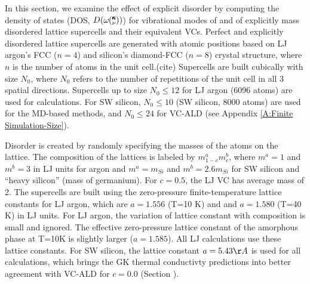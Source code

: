 \documentclass[aps,prb,onecolumn,preprint,superscriptaddress,amsmath,amssymb,floatfix]{revtex4}
\newcommand{\kv}{\mspace{-4.0mu}\left(\mspace{-8.0mu}
\begin{smallmatrix}&\pmb{\kappa} \\&\nu\end{smallmatrix}
\mspace{-3.0mu}\right)}
\begin{document}
In this section, we examine the effect of explicit disorder by computing 
the density of states (DOS, $D(\omega\kv)$) for vibrational modes of  
and of explicitly mass disordered lattice supercells and their 
equivalent VCs. 
Perfect and explicitly disordered lattice supercells are generated 
with atomic positions 
based on LJ argon's FCC ($n=4$) and silicon's diamond-FCC ($n=8$) 
crystal structure, where $n$ is the number of atoms 
in the unit cell.(cite)  
Supercells are built cubically with size $N_0$, where $N_0$ refers to the 
number of repetitions of the unit cell in all 3 
spatial directions. Supercells up to size $N_0 \le 12$ 
for LJ argon (6096 atoms) are used for calculations. For SW silicon, 
$N_0 \le 10$ (SW silicon, 8000 atoms) are used for 
the MD-based methods, and $N_0 \le 24$ for VC-ALD 
(see Appendix \ref{A:Finite Simulation-Size}).  

Disorder is created by randomly specifying the masses of the atoms 
on the lattice. 
The composition of the lattices is labeled by $m^a_{1-c}m^b_{c}$,  
where $m^a=1$ and $m^b=3$ in 
LJ units for argon and $m^a=m_{Si}$ and $m^b=2.6m_{Si}$ 
for SW silicon and ``heavy silicon'' (mass of germanium). 
For $c=0.5$, the LJ VC has average mass of 2. 
The supercells are built using 
the zero-pressure finite-temperature lattice constants 
for LJ argon, which are $a=1.556$ (T=10 K) and 
and $a=1.580$ (T=40 K) in LJ units.\cite{mcgaughey_phonon_2004} 
For LJ argon, the variation of lattice constant 
with composition is small and ignored. 
The effective zero-pressure lattice constant 
of the amorphous phase at T=10K is slightly larger 
($a = 1.585$).\cite{mcgaughey_phonon_2004}  
All LJ calculations use these lattice constants. 
For SW silicon, the lattice constant $a=5.43 \AA$ is used 
for all calculations, which brings the GK thermal conductivty 
predictions\cite{goicochea_thermal_2010} 
into better agreement with VC-ALD
\cite{sellan_cross-plane_2010} for $c=0.0$ (Section ).
\end{document}
